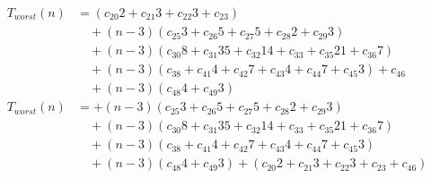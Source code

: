 \begin{subequations}
\label{eq:analyse-argetcontour-contour}
\begin{align}
\label{eq:analyse-argetcontour1}
T_{worst}(n)& =
(c_{20}2 + c_{21}3 + c_{22}3 + c_{23})
\\
& \quad
+ (n-3)(c_{25}3 + c_{26}5 + c_{27}5 + c_{28}2 + c_{29}3)
\nonumber \\
& \quad
+ (n-3)(c_{30}8 + c_{31}35 + c_{32}14 + c_{33} + c_{35}21 + c_{36}7)
\nonumber \\
& \quad
+ (n-3)(c_{38} + c_{41}4 + c_{42}7 + c_{43}4 + c_{44}7 + c_{45}3)
+ c_{46}
\nonumber \\
& \quad
+ (n-3)(c_{48}4 + c_{49}3)
\nonumber \\
\label{eq:analyse-argetcontour2}
T_{worst}(n)& =
+ (n-3)(c_{25}3 + c_{26}5 + c_{27}5 + c_{28}2 + c_{29}3)
\\
& \quad
+ (n-3)(c_{30}8 + c_{31}35 + c_{32}14 + c_{33} + c_{35}21 + c_{36}7)
\nonumber \\
& \quad
+ (n-3)(c_{38} + c_{41}4 + c_{42}7 + c_{43}4 + c_{44}7 + c_{45}3)
\nonumber \\
& \quad
+ (n-3)(c_{48}4 + c_{49}3)
+ (c_{20}2 + c_{21}3 + c_{22}3 + c_{23} + c_{46})
\nonumber
\end{align}
\end{subequations}

